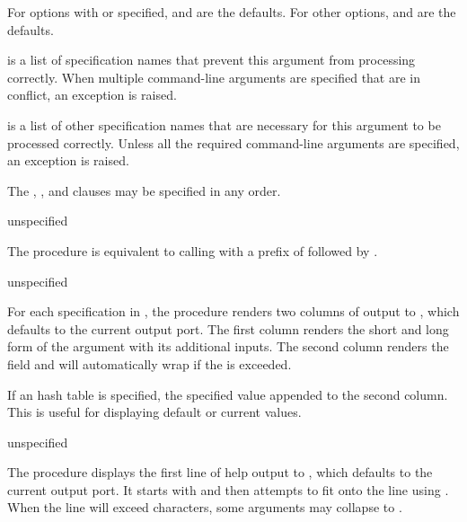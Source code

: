For options with  or  specified,  and
 are the defaults. For other options,  and
 are the defaults.

 is a list of specification names that prevent this
argument from processing correctly. When multiple command-line
arguments are specified that are in conflict, an exception is raised.

 is a list of other specification names that are
necessary for this argument to be processed correctly. Unless all the
required command-line arguments are specified, an exception is raised.

The , , and  clauses may be
specified in any order.

\begin{procedure}
\end{procedure}
\returns{} unspecified

The  procedure is equivalent to calling
 with a prefix of  followed by
.

\begin{procedure}
\end{procedure}
\returns{} unspecified

For each specification in , the 
procedure renders two columns of output to , which defaults to
the current output port. The first column renders the short and long
form of the argument with its additional inputs. The second column
renders the   field and will automatically
wrap if the  is exceeded.

If an  hash table is specified, the specified value appended
to the second column. This is useful for displaying default or current
values.

\begin{procedure}
\end{procedure}
\returns{} unspecified

The  procedure displays the first line of help
output to , which defaults to the current output port. It
starts with  and  then attempts to fit
 onto the line using . When the line will
exceed  characters, some arguments may collapse to
\code{[options]}.

